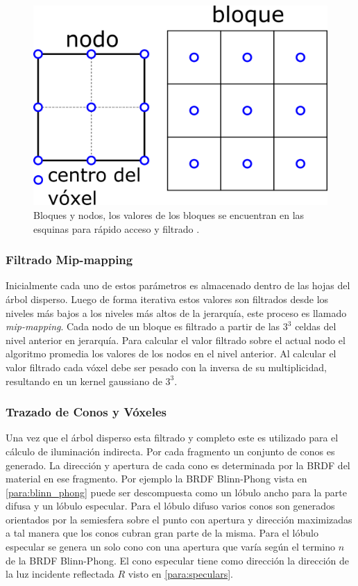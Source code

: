 \begin{figure}[H]
	\centering
	\includegraphics[width=0.3\linewidth]{media/bricks_vct.png}
	\caption{Bloques y nodos, los valores de los bloques se encuentran en las esquinas para rápido acceso y filtrado \cite{CNSGE11b}.}
	\label{fig:bricks_vct}
\end{figure}

\subsubsection{Filtrado Mip-mapping}
\label{subsub:mipmaping_orig}
Inicialmente cada uno de estos parámetros es almacenado dentro de las hojas del árbol disperso. Luego de forma iterativa estos valores son filtrados desde los niveles más bajos a los niveles más altos de la jerarquía, este proceso es llamado \emph{mip-mapping}. Cada nodo de un bloque es filtrado a partir de las $3^3$ celdas del nivel anterior en jerarquía. Para calcular el valor filtrado sobre el actual nodo el algoritmo promedia los valores de los nodos en el nivel anterior. Al calcular el valor filtrado cada vóxel debe ser pesado con la inversa de su multiplicidad, resultando en un kernel gaussiano de $3^3$. 

\subsubsection{Trazado de Conos y Vóxeles}
Una vez que el árbol disperso esta filtrado y completo este es utilizado para el cálculo de iluminación indirecta. Por cada fragmento un conjunto de conos es generado. La dirección y apertura de cada cono es determinada por la \ac{BRDF} del material en ese fragmento. Por ejemplo la \ac{BRDF} Blinn-Phong vista en \ref{para:blinn_phong} puede ser descompuesta como un lóbulo ancho para la parte difusa y un lóbulo especular. Para el lóbulo difuso varios conos son generados orientados por la semiesfera sobre el punto con apertura y dirección maximizadas a tal manera que los conos cubran gran parte de la misma. Para el lóbulo especular se genera un solo cono con una apertura que varía según el termino $n$ de la \ac{BRDF} Blinn-Phong. El cono especular tiene como dirección la dirección de la luz incidente reflectada $R$ visto en \ref{para:speculars}.

